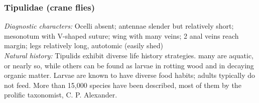 \documentclass[letterpaper, 11pt]{article}
\begin{document}
\subsubsection{Tipulidae (crane flies)}
\noindent{}\textit{Diagnostic characters:} Ocelli absent; antennae slender but relatively short; mesonotum with V-shaped suture; wing with many veins; 2 anal veins reach margin; legs relatively long, autotomic (easily shed)\\

\noindent{}\textit{Natural history:} Tipulids exhibit diverse life history strategies. many are aquatic, or nearly so, while others can be found as larvae in rotting wood and in decaying organic matter. Larvae are known to have diverse food habits; adults typically do not feed. More than 15,000 species have been described, most of them by the prolific taxonomist, C. P. Alexander.
\end{document}
